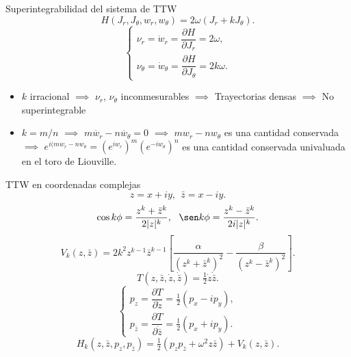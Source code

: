 \documentclass[aspectratio=169,mathserif]{beamer}
\begin{document}
  \begin{frame}{Superintegrabilidad del sistema de TTW}
    \begin{equation*}
      H(J_r,J_\theta,w_r,w_\theta)=2\omega(J_r+kJ_\theta).
    \end{equation*}
    \pause
    \begin{equation*}
      \begin{cases}
	\nu_r=\dot{w}_r=\dfrac{\partial H}{\partial J_r}= 2\omega, \\[7 pt]
	\nu_\theta=\dot{w}_\theta=\dfrac{\partial H}{\partial J_\theta}= 2k\omega.
      \end{cases}
    \end{equation*}
    \pause
    \begin{itemize}
      \item $k$ irracional $\implies$ $\nu_r$, $\nu_\theta$ inconmesurables $\implies$ Trayectorias densas $\implies$ No superintegrable
    \pause
      \item $k=m/n$ $\implies$ $m\dot{w_r}-n\dot{w_\theta}=0$ $\implies$ $mw_r-nw_\theta$ es una cantidad conservada $\implies$
      $e^{i(mw_r - nw_{\theta}}=(e^{iw_r})^m(e^{-iw_\theta})^n$
    es una cantidad conservada univaluada en el toro de Liouville.
    \end{itemize}

  \end{frame}

  \begin{frame}{TTW en coordenadas complejas}
    \begin{equation*}
      z= x+ iy, \ \ \bar{z} = x- iy.
    \end{equation*}
    \pause
    \begin{equation*}
      \cos k\phi = \frac{z^k + \bar{z}^k}{2 |z|^k}, \ \ \sen k\phi = \frac{z^k - \bar{z}^k}{2i |z|^k}.
    \end{equation*}
    \pause
    \begin{equation*}
      V_k(z,\bar{z})=2k^2 z^{k-1}\bar{z}^{k-1}\left[ \frac{\alpha}{(z^k+\bar{z}^k)^2}-\frac{\beta}{(z^k-\bar{z}^k)^2} \right].
    \end{equation*}
    \pause
    \begin{equation*}
      T(z,\bar{z},\dot{z},\dot{\bar{z}})=\tfrac{1}{2}\dot{z}\dot{\bar{z}}.
    \end{equation*}
    \pause
    \begin{equation*}
      \begin{cases}
	p_z=\dfrac{\partial T}{\partial \dot{z}}= \frac{1}{2}(p_x-ip_y),\\[5 pt]
      p_{\bar{z}}=\dfrac{\partial T}{\partial \dot{\bar{z}}}= \frac{1}{2}(p_x+ip_y).
    \end{cases}
    \end{equation*}
    \pause
    \begin{equation*}
      H_k(z,\bar{z},p_z,p_{\bar{z}})=\tfrac{1}{2}(p_zp_{\bar{z}}+\omega^2 z \bar{z})+ V_k(z,\bar{z}).
    \end{equation*}
  \end{frame}
\end{document}
